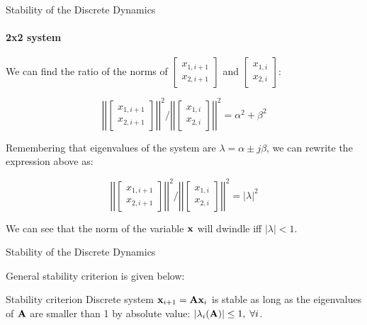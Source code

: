 \documentclass{beamer}
\begin{document}
\begin{frame}{Stability of the Discrete Dynamics}
	\framesubtitle{2x2 system}
	\begin{flushleft}
		
		We can find the ratio of the norms of $\begin{bmatrix}
			x_{1, i+1} \\ x_{2, i+1}
		\end{bmatrix}$ and $\begin{bmatrix}
			x_{1, i} \\ x_{2, i}
		\end{bmatrix}$: 
		
		
		
		\begin{equation}
			\left | \left|
			\begin{bmatrix}
				x_{1, i+1} \\ x_{2, i+1}
			\end{bmatrix}
			\right | \right|^2 
			/ 
			\left | \left|
			\begin{bmatrix}
				x_{1, i} \\ x_{2, i}
			\end{bmatrix}
			\right | \right|^2
			= 
			\alpha^2 + \beta^2
		\end{equation}
		
		Remembering that eigenvalues of the system are $\lambda  = \alpha \pm j\beta$, we can rewrite the expression above as:
		
		\begin{equation}
	\left | \left|
	\begin{bmatrix}
		x_{1, i+1} \\ x_{2, i+1}
	\end{bmatrix}
	\right | \right|^2 
	/ 
	\left | \left|
	\begin{bmatrix}
		x_{1, i} \\ x_{2, i}
	\end{bmatrix}
	\right | \right|^2
	= 
	| \lambda |^2
		\end{equation}		
		
		We can see that the norm of the variable $\mathbf{x}$ will dwindle iff $|\lambda| < 1$.
		
	\end{flushleft}
\end{frame}




\begin{frame}{Stability of the Discrete Dynamics}
\begin{flushleft}

General stability criterion is given below:

\bigskip

\begin{block}{Stability criterion}
Discrete system $\mathbf{x}_{i+1} = \mathbf{A}\mathbf{x}_i$ is stable as long as the eigenvalues of $\mathbf{A}$ are smaller than 1 by absolute value: $|\lambda_i(\mathbf{A})| \leq 1, \; \forall i$.
\end{block}

\end{flushleft}
\end{frame}
\end{document}
